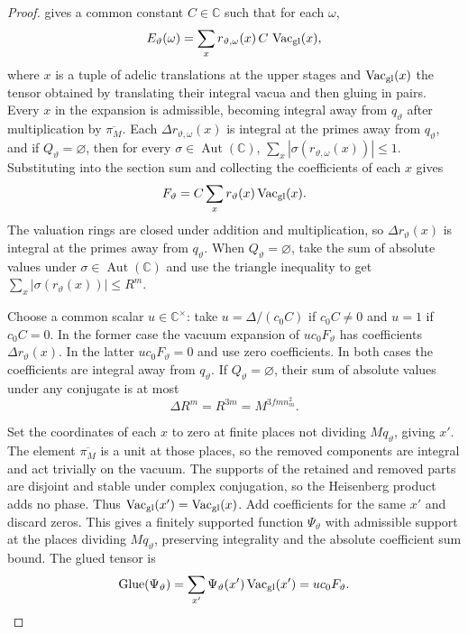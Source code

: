 \begin{proof}
 gives a common constant $C\in\mathbb C$ such that for each $\omega$,
\[
 E_\vartheta(\omega)=\sum_x r_{\vartheta,\omega}(x)\,
                         C\,\operatorname{Vac}_{\rm gl}(x),
\]
where $x$ is a tuple of adelic translations at the upper stages and $\operatorname{Vac}_{\rm gl}(x)$ the tensor obtained by translating their integral vacua and then gluing in pairs. Every $x$ in the expansion is admissible, becoming integral away from $q_\vartheta$ after multiplication by $\overline{\pi_M}$. Each $\Delta r_{\vartheta,\omega}(x)$ is integral at the primes away from $q_\vartheta$, and if $Q_\vartheta=\varnothing$, then for every $\sigma\in\operatorname{Aut}(\mathbb C)$,
$\sum_x|\sigma(r_{\vartheta,\omega}(x))|\le1$.
Substituting into the section sum and collecting the coefficients of each $x$ gives
\[
 F_\vartheta=C\sum_x r_\vartheta(x)\operatorname{Vac}_{\rm gl}(x).
\]
The valuation rings are closed under addition and multiplication, so $\Delta r_\vartheta(x)$ is integral at the primes away from $q_\vartheta$. When $Q_\vartheta=\varnothing$, take the sum of absolute values under $\sigma\in\operatorname{Aut}(\mathbb C)$ and use the triangle inequality to get $\sum_x|\sigma(r_\vartheta(x))|\le R^m$.

Choose a common scalar $u\in\mathbb C^\times$: take $u=\Delta/(c_0C)$ if $c_0C\ne0$ and $u=1$ if $c_0C=0$. In the former case the vacuum expansion of $u c_0F_\vartheta$ has coefficients $\Delta r_\vartheta(x)$. In the latter $u c_0F_\vartheta=0$ and use zero coefficients. In both cases the coefficients are integral away from $q_\vartheta$. If $Q_\vartheta=\varnothing$, their sum of absolute values under any conjugate is at most
\[
 \Delta R^m=R^{3m}=M^{3fm n_m^2}.
\]

Set the coordinates of each $x$ to zero at finite places not dividing $M q_\vartheta$, giving $x'$. The element $\overline{\pi_M}$ is a unit at those places, so the removed components are integral and act trivially on the vacuum. The supports of the retained and removed parts are disjoint and stable under complex conjugation, so the Heisenberg product adds no phase. Thus $\operatorname{Vac}_{\rm gl}(x')=\operatorname{Vac}_{\rm gl}(x)$. Add coefficients for the same $x'$ and discard zeros. This gives a finitely supported function $\Psi_\vartheta$ with admissible support at the places dividing $M q_\vartheta$, preserving integrality and the absolute coefficient sum bound. The glued tensor is
\[
 \operatorname{Glue}(\Psi_\vartheta)
 =\sum_{x'}\Psi_\vartheta(x')\operatorname{Vac}_{\rm gl}(x')
 =u c_0F_\vartheta.
\]


\end{proof}
